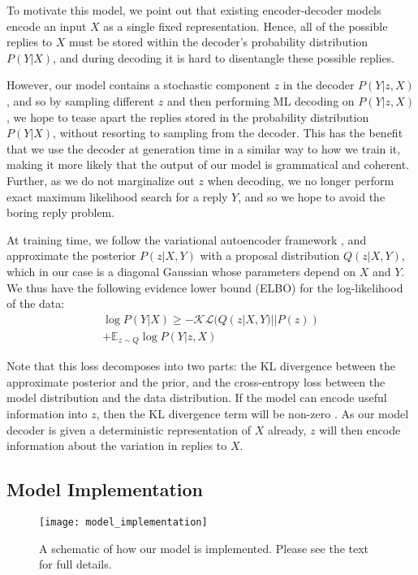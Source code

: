 To motivate this model, we point out that existing encoder-decoder models encode an input $X$ as a single fixed representation. Hence, all of the possible replies to $X$ must be stored within the decoder's probability distribution $P(Y|X)$, and during decoding it is hard to disentangle these possible replies.

However, our model contains a stochastic component $z$ in the decoder $P(Y | z, X)$, and so by sampling different $z$ and then performing ML decoding on $P(Y | z, X)$, we hope to tease apart the replies stored in the probability distribution $P(Y|X)$, without resorting to sampling from the decoder. This has the benefit that we use the decoder at generation time in a similar way to how we train it, making it more likely that the output of our model is grammatical and coherent. Further, as we do not marginalize out $z$ when decoding, we no longer perform exact maximum likelihood search for a reply $Y$, and so we hope to avoid the boring reply problem.

At training time, we follow the variational autoencoder framework \citep{Kingma:14,Kingma:14b,Sohn:15,Miao:16a} , and approximate the posterior $P(z | X, Y)$ with a proposal distribution $Q(z | X, Y)$, which in our case is a diagonal Gaussian whose parameters depend on $X$ and $Y$. We thus have the following evidence lower bound (ELBO) for the log-likelihood of the data:
\begin{multline}
    \log P(Y | X) \geq -\mathcal{KL} (Q(z | X, Y) || P(z)) \\ + \mathbb{E}_{z \sim Q} \log P(Y | z, X)
\end{multline}

Note that this loss decomposes into two parts: the KL divergence between the approximate posterior and the prior, and the cross-entropy loss between the model distribution and the data distribution. If the model can encode useful information into $z$, then the KL divergence term will be non-zero \citep{Bowman:16}. As our model decoder is given a deterministic representation of $X$ already, $z$ will then encode information about the variation in replies to $X$.

\subsection{Model Implementation}

\begin{figure}[t]
    \centering
    \texttt{[image: model\_implementation]}
    \caption{A schematic of how our model is implemented. Please see the text for full details.}
    \label{fig:model_implementation}
\end{figure}

